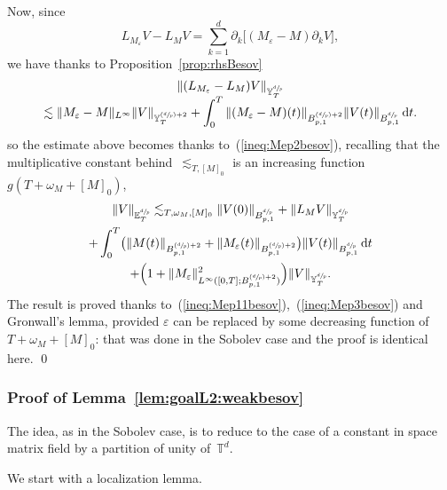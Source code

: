\documentclass[JEP,XML,SOM,Unicode,published]{cedram}
\newcommand{\Psfrac}[2]{(\sfrac{#1}{#2})}
\theoremstyle{definition}
\newcommand\T{\mathbb{T}}
\newcommand\dd{\mathrm{d}}
\let\ep\varepsilon
\begin{document}
Now, since\vspace*{-3pt}
\[
L_{M_\ep }V-L_{M }V = \sum_{k=1}^d \partial_k \bigl[(M_\ep-M)\partial_k V\bigr],
\]
we have thanks to Proposition~\ref{prop:rhsBesov}\vspace*{-5pt}
\begin{multline*}
\|(L_{M_\ep}-L_M)V\|_{ {\mathbb Y}^{\sfrac dp}_T}\\[-5pt]
\lesssim \|M_\ep-M\|_{L^\infty } \|V\|_{ {\mathbb Y}^{\Psfrac dp+2}_T} +
\int_0^T \| (M_\ep-M)(t)\|_{B^{\Psfrac dp+2}_{p,1}} \|V(t)\|_{B^{\sfrac dp}_{p,1}} \, \dd t.
\end{multline*}
so the estimate above becomes thanks to~(\ref{ineq:Mep2besov}), recalling that the multiplicative constant behind~$ \lesssim_{T,[M]_0}$ is an increasing function~$ g(T+\omega_M+[M]_0)$,\vspace*{-5pt}
\begin{multline*}
\|V\|_{{\mathbb E}^{\sfrac dp}_T} \lesssim_{T,\omega_M,[M]_0} \|V(0)\|_{B^{\sfrac dp}_{p,1}} + \| L_{M } V \|_{{\mathbb Y}^{\sfrac dp}_T } \\
+
\int_0^T\bigl(\| M(t)\|_{B^{\Psfrac dp+2}_{p,1}}+ \| M_\ep(t)\|_{B^{\Psfrac dp+2}_{p,1}}\bigr) \|V(t)\|_{B^{\sfrac dp}_{p,1}} \, \dd t \\
+ \Bigl(1+\|M_\ep\|^2_{ L^\infty ([0,T];B^{\Psfrac dp+2}_{p,1}) }\Bigr) \|V\|_ {{\mathbb Y}^{\sfrac dp}_T}.
\end{multline*}
The result is proved thanks to~(\ref{ineq:Mep11besov}),~(\ref{ineq:Mep3besov}) and Gronwall's lemma, provided $\ep$ can be replaced by some decreasing function of $T+\omega_M+[M]_0$: that was done in the Sobolev case and the proof is identical here. \qed

\subsubsection{Proof of Lemma~\ref{lem:goalL2:weakbesov}}\label{subsec:proof_lemmabesov}
The idea, as in the Sobolev case, is to reduce to the case of a constant in space matrix field by a partition of unity of~$ \T^d$.

We start with a localization lemma.
\end{document}
